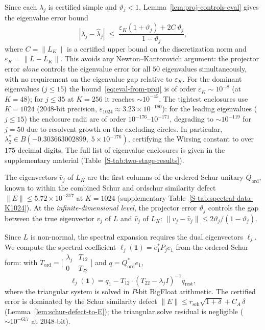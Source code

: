 Since each $\lambda_j$ is certified simple and $\vartheta_j < 1$,
Lemma~\ref{lem:proj-controls-eval} gives the eigenvalue error bound
\begin{equation}
\label{eq:eval-from-proj}
|\lambda_j - \hat\lambda_j|
\;\leq\;
\frac{\varepsilon_K(1 + \vartheta_j) + 2C\,\vartheta_j}{1 - \vartheta_j},
\end{equation}
where $C = \|L_K\|$ is a certified upper bound on the
discretization norm and $\varepsilon_K = \|L - L_K\|$.
This avoids any Newton--Kantorovich argument: the projector error
\emph{alone} controls the eigenvalue error for all $50$ eigenvalues
simultaneously, with no requirement on the eigenvalue gap relative
to $\varepsilon_K$.  For the dominant eigenvalues ($j \leq 15$) the
bound~\eqref{eq:eval-from-proj} is of order $\varepsilon_K \sim 10^{-8}$
(at $K = 48$); for $j \leq 35$ at $K = 256$ it reaches $\sim 10^{-45}$.
The tightest enclosures use $K = 1024$ (2048-bit precision,
$\varepsilon_{1024} \approx 3.23 \times 10^{-180}$): for the leading
eigenvalues ($j \leq 15$) the enclosure radii are of
order $10^{-176}$--$10^{-171}$, degrading to $\sim 10^{-119}$ for
$j = 50$ due to resolvent growth on the excluding circles.
In particular, $\lambda_2^* \in B(-0.303663002899, \; 5 \times 10^{-176})$,
certifying the Wirsing constant to over $175$ decimal digits.
The full list of eigenvalue enclosures is given in the supplementary
material (Table~\ref{S-tab:two-stage-results}).

The eigenvectors $\hat v_j$
of $L_K$ are the first columns of the ordered Schur unitary $Q_{\mathrm{ord}}$,
known to within the combined Schur and ordschur similarity defect
$\|E\| \leq 5.72 \times 10^{-317}$ at $K = 1024$
(supplementary Table~\ref{S-tab:spectral-data-K1024}).
At the \emph{infinite-dimensional level}, the projector error
$\vartheta_j$ controls the gap between the true eigenvector $v_j$ of
$L$ and $\hat v_j$ of $L_K$:
$\|v_j - \hat v_j\| \leq 2\vartheta_j / (1 - \vartheta_j)$.

Since $L$ is non-normal, the spectral expansion requires the dual eigenvectors
$\ell_j$.  We compute the spectral coefficient
$\ell_j(\mathbf{1}) = e_1^* P_j e_1$ from the ordered Schur form:
with $T_{\mathrm{ord}} =
  \bigl[\begin{smallmatrix} \lambda_j & T_{12} \\ 0 & T_{22}\end{smallmatrix}\bigr]$
and $q = Q_{\mathrm{ord}}^* e_1$,
\begin{equation}
\label{eq:ell-formula}
\ell_j(\mathbf{1})
  = q_1 - T_{12} \cdot (T_{22} - \lambda_j I)^{-1} q_{\mathrm{rest}},
\end{equation}
where the triangular system is solved in $P$-bit BigFloat arithmetic.
The certified error is dominated by the Schur similarity defect
$\|E\| \leq r_{\mathrm{sch}}\sqrt{1+\delta} + C_A\,\delta$
(Lemma~\ref{lem:schur-defect-to-E}); the triangular solve
residual is negligible ($\sim 10^{-617}$ at 2048-bit).

